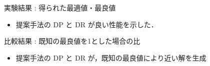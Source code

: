 \documentclass[11pt,dvipdfmx,handout]{beamer}
\begin{document}
\newenvironment{tableB}{%
  \tabcolsep = 2mm
  \renewcommand{\arraystretch}{0.815}						
  \begin{tabular}[t]{c||r|r|r|r|r|r|}\hline
    Instance & 既存ASP解法 & R-0 & R-10 & R-20 & R-dp & R-dr \\\hline
    }{%
    \hline
  \end{tabular}
}
\begin{frame}{実験結果 : 得られた最適値・最良値}

\begin{table}[tbp]\scriptsize
  \label{table:bench:result1}
  \centering
  \begin{tableA}
    
  \end{tableA}
\end{table}
\begin{itemize}
\item 提案手法の DP と DR が良い性能を示した．
\end{itemize}
\end{frame}
\begin{frame}{比較結果 : 既知の最良値を1とした場合の比}
\begin{table}[tbp]\scriptsize
  \label{table:bench:result2}
  \centering
  \begin{tableA}
    
  \end{tableA}
\end{table}
\begin{itemize}
\item 提案手法の DP と DR が，既知の最良値により近い解を生成
\end{itemize}\end{frame}
\end{document}
